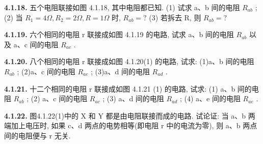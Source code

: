 \begin{center}
\end{center}

\begin{center}
\end{center}

\begin{center}
\end{center}

\vfill
\newpage

\textbf{4.1.18.} 五个电阻联接如图 4.1.18, 其中电阻都已知. (1) 试求 a、b 间的电阻 $R_{ab}$ ; (2) 当 $R_{1}=4\Omega, R_{2}=2\Omega, R=1\Omega$ 时, $R_{ab}=?$ (3) 若拆去 R, 则 $R_{ab}=?$

\begin{center}
\end{center}

\vfill
\newpage

\textbf{4.1.19.} 六个相同的电阻 r 联接成如图 4.1.19 的电路, 试求 a、b 间的电阻 $R_{ab}$ 以及 a、c 间的电阻 $R_{ac}$ .

\begin{center}
\end{center}

\vfill
\newpage

\textbf{4.1.20.} 八个相同的电阻 r 联接成如图 4.1.20(1) 的电路, 试求: (1)a、b 间的电阻 $R_{ab}$ ; (2)a、c 间的电阻 $R_{ac}$ ; (3)a、d 间的电阻 $R_{ad}$ .

\begin{center}
\end{center}

\vfill
\newpage

\textbf{4.1.21.} 十二个相同的电阻 r 联接成如图 4.1.21 (1) 的电路, 试求: (1) a、b 间的电阻 $R_{ab}$ ; (2) a、c 间的电阻 $R_{ac}$ ; (3) a、d 间的电阻 $R_{ad}$ ; (4) a、e 间的电阻 $R_{ae}$ .

\vfill
\newpage

\textbf{4.1.22.} 图4.1.22(1)中的 X 和 Y 都是由电阻联接而成的电路. 试论证: 当 a、b 两端加上电压时, 如果 c、d 两点的电势相等(即电阻 r 中的电流为零), 则 a、b 两点间的电阻便与 r 无关.

\begin{center}
\end{center}


